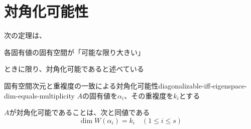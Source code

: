 \documentclass[../../../topic_linear-algebra]{subfiles}
\begin{document}
\sectionline
\section{対角化可能性}

次の定理は、
\begin{shaded}
  各固有値の固有空間が「可能な限り大きい」
\end{shaded}
ときに限り、対角化可能であると述べている

\begin{theorem}{固有空間次元と重複度の一致による対角化可能性}{diagonalizable-iff-eigenspace-dim-equals-multiplicity}
  $A$の固有値を$\alpha_i$、その重複度を$k_i$とする

  $A$が対角化可能であることは、次と同値である
  \begin{equation*}
    \dim W(\alpha_i) = k_i \quad (1 \leq i \leq s)
  \end{equation*}
\end{theorem}
\end{document}

